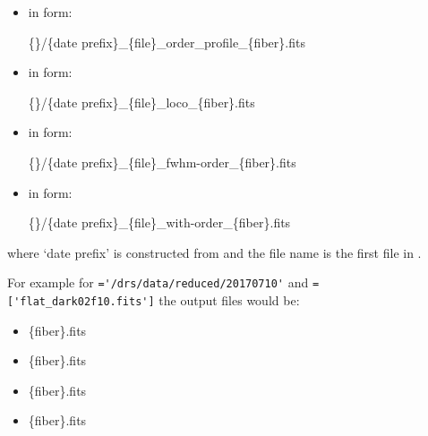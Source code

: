 \begin{itemize}
\item {} in form:
\begin{tcustomdir}
\{\reduceddir\}/\{date prefix\}\_\{file\}\_order\_profile\_\{fiber\}.fits
\end{tcustomdir}

\item {} in form:
\begin{tcustomdir}
\{\reduceddir\}/\{date prefix\}\_\{file\}\_loco\_\{fiber\}.fits
\end{tcustomdir}

\item {} in form:
\begin{tcustomdir}
\{\reduceddir\}/\{date prefix\}\_\{file\}\_fwhm-order\_\{fiber\}.fits
\end{tcustomdir}

\item {} in form:
\begin{tcustomdir}
\{\reduceddir\}/\{date prefix\}\_\{file\}\_with-order\_\{fiber\}.fits
\end{tcustomdir}

\end{itemize}

\noindent where `date prefix' is constructed from \argnightname and the file name is the first file in \argfilenames. \\

\clearpage
\newpage

\noindent For example for \reduceddir\lstinline[style=pythoninline]|='/drs/data/reduced/20170710'| and \argfilenames\lstinline[style=pythoninline]|=['flat_dark02f10.fits']| the output files would be:
\begin{tcustomdir}
\begin{itemize}
\item {}\{fiber\}.fits
\item {}\{fiber\}.fits
\item {}\{fiber\}.fits
\item {}\{fiber\}.fits
\end{itemize}
\end{tcustomdir}

